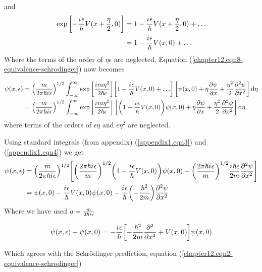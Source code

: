 	and 
	\begin{align*}
		\exp\qty[-\frac{{i\mkern1mu} \epsilon}{\hbar} V(x + \frac{\eta}{2}, 0)] 
		&= 1 - \frac{{i\mkern1mu} \epsilon}{\hbar} V(x + \frac{\eta}{2}, 0) + \ldots \\
		&= 1 - \frac{{i\mkern1mu} \epsilon}{\hbar} V(x, 0) + \ldots
	\end{align*}
	Where the terms of the order of $\eta \epsilon$ are neglected. Equation (\ref{chapter12.eqn8-equivalence-schrodinger}) now becomes
	
	\begin{align}
		\begin{split}
		\psi\qty(x, \epsilon) 
		&= \qty(\frac{m}{2\pi \hbar {i\mkern1mu} \epsilon})^{1/2} \int_{-\infty}^{\infty} \exp\qty[\frac{{i\mkern1mu} m \eta^2}{2\hbar \epsilon}]  \qty[1 - \frac{{i\mkern1mu} \epsilon}{\hbar} V(x, 0)+ \ldots] \left[\psi\qty(x, 0) + \eta \pdv{\psi}{x} + \frac{\eta^2}{2} \pdv[2]{\psi}{x}\right] \dd{\eta}\\
		&= \qty(\frac{m}{2\pi \hbar {i\mkern1mu} \epsilon})^{1/2} \int_{-\infty}^{\infty} \exp\qty[\frac{{i\mkern1mu} m \eta^2}{2\hbar \epsilon}] \left[\qty(1 - \frac{{i\mkern1mu} \epsilon}{\hbar} V(x, 0))\psi\qty(x, 0) + \eta \pdv{\psi}{x} + \frac{\eta^2}{2} \pdv[2]{\psi}{x} \right] \dd{\eta}
		\end{split}
	\end{align}
	where terms of the orders of $\epsilon \eta$ and $\epsilon \eta^2$ are neglected.
	
	Using standard integrals (from appendix) (\ref{appendix1.eqn3}) and (\ref{appendix1.eqn4}) we get
	\begin{align*}
		\psi\qty(x, \epsilon) 
		&= \qty(\frac{m}{2\pi \hbar {i\mkern1mu} \epsilon})^{1/2} \qty[\qty(\frac{2\pi \hbar {i\mkern1mu} \epsilon}{m})^{1/2}
		\qty(1 - \frac{{i\mkern1mu} \epsilon}{\hbar} V\qty(x , 0))\psi\qty(x,0)  +  \qty(\frac{2\pi \hbar {i\mkern1mu} \epsilon}{m})^{1/2} \frac{{i\mkern1mu} \hbar \epsilon}{2 m} \pdv[2]{\psi}{x}] \\
		&= \psi\qty(x, 0) - \frac{{i\mkern1mu} \epsilon}{\hbar} V\qty(x, 0) \psi\qty(x, 0) - \frac{{i\mkern1mu} \epsilon}{\hbar} \qty(- \frac{\hbar^2}{2 m}) \pdv[2]{\psi}{x}
	\end{align*}
	Where we have used $a = \frac{m}{2\hbar{i\mkern1mu} \epsilon}$
	
	\begin{equation}
		\psi\qty(x, \epsilon) - \psi\qty(x, 0) = -\frac{{i\mkern1mu} \epsilon}{\hbar} \qty[-\frac{\hbar^2}{2 m} \pdv[2]{x} + V\qty(x,0)] \psi\qty(x, 0)
		\label{chapter12.eqn9-equivalence-schrodinger}
	\end{equation}
	
	Which agrees with the Schr\"{o}dinger prediction, equation (\ref{chapter12.eqn2-equivalence-schrodinger})


